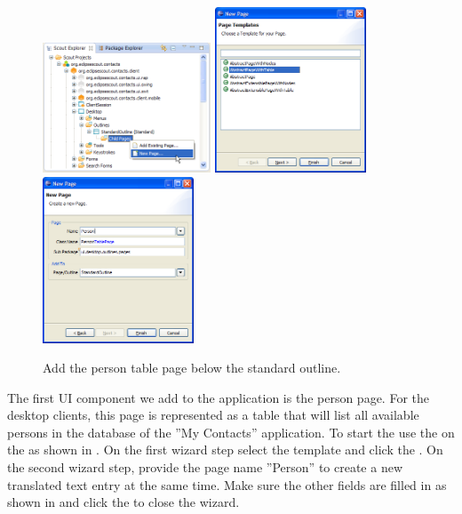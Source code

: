 \documentclass[a4paper,10pt,twoside]{book}
\begin{document}
\begin{figure}
\includegraphics[width=5cm]{new_page_person_contextmenu.png} \hspace{2mm}
\includegraphics[width=4.5cm]{new_page_person_1.png} \hspace{2mm}
\includegraphics[width=4.5cm]{new_page_person_2.png}
\caption{Add the person table page below the standard outline. }
\end{figure}

The first UI component we add to the application is the person page. 
For the desktop clients, this page is represented as a table that will list all available persons in the database of the ''My Contacts'' application. 
To start the  use the  on the  as shown in .
On the first wizard step select the template  and click the . 
On the second wizard step, provide the page name ''Person'' to create a new translated text entry at the same time. 
Make sure the other fields are filled in as shown in  and click the  to close the wizard.
\end{document}
